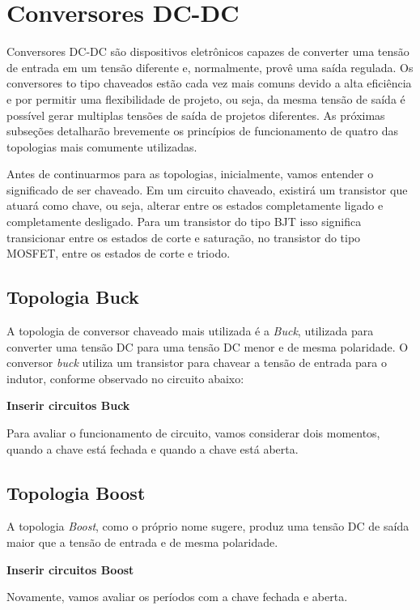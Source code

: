 \section{Conversores DC-DC}\label{converters_revision}
Conversores DC-DC são dispositivos eletrônicos capazes de converter uma tensão de entrada em um tensão diferente e, normalmente, provê uma saída regulada. Os conversores to tipo chaveados estão cada vez mais comuns devido a alta eficiência e por permitir uma flexibilidade de projeto, ou seja, da mesma tensão de saída é possível gerar multiplas tensões de saída de projetos diferentes. As próximas subseções detalharão brevemente os princípios de funcionamento de quatro das topologias mais comumente utilizadas.

Antes de continuarmos para as topologias, inicialmente, vamos entender o significado de ser chaveado. Em um circuito chaveado, existirá um transistor que atuará como chave, ou seja, alterar entre os estados completamente ligado e completamente desligado. Para um transistor do tipo BJT isso significa transicionar entre os estados de corte e saturação, no transistor do tipo MOSFET, entre os estados de corte e triodo. 

\subsection{Topologia Buck}
A topologia de conversor chaveado mais utilizada é a \textit{Buck}, utilizada para converter uma tensão DC para uma tensão DC menor e de mesma polaridade. O conversor \textit{buck} utiliza um transistor para chavear a tensão de entrada para o indutor, conforme observado no circuito abaixo:

\textbf{ Inserir circuitos Buck }

Para avaliar o funcionamento de circuito, vamos considerar dois momentos, quando a chave está fechada e quando a chave está aberta.



\subsection{Topologia Boost}
A topologia \textit{Boost}, como o próprio nome sugere, produz uma tensão DC de saída maior que a tensão de entrada e de mesma polaridade. 

\textbf{ Inserir circuitos Boost }

Novamente, vamos avaliar os períodos com a chave fechada e aberta.



